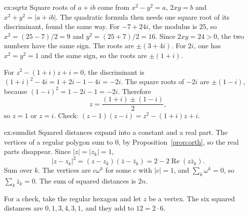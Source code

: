 \begin{solution}{ex:sqrtz}
\idea Square roots of $a+ib$ come from $x^2-y^2=a$, $2xy=b$ and $x^2+y^2=|a+ib|$. The quadratic formula then needs one square root of its discriminant, found the same way.
\writeup For $-7+24i$, the modulus is $25$, so $x^2=(25-7)/2=9$ and $y^2=(25+7)/2=16$. Since $2xy=24>0$, the two numbers have the same sign. The roots are $\pm(3+4i)$. For $2i$, one has $x^2=y^2=1$ and the same sign, so the roots are $\pm(1+i)$.

For $z^2-(1+i)z+i=0$, the discriminant is $(1+i)^2-4i=1+2i-1-4i=-2i$. The square roots of $-2i$ are $\pm(1-i)$, because $(1-i)^2=1-2i-1=-2i$. Therefore
\[
z=\frac{(1+i)\pm(1-i)}2,
\]
so $z=1$ or $z=i$. Check: $(z-1)(z-i)=z^2-(1+i)z+i$.
\end{solution}

\begin{solution}{ex:sumdist}
\idea Squared distances expand into a constant and a real part. The vertices of a regular polygon sum to $0$, by Proposition~\ref{prop:orth}, so the real parts disappear.
\writeup Since $|z|=|z_k|=1$,
\[
|z-z_k|^2=(z-z_k)(\bar z-\bar z_k)=2-2\operatorname{Re}(z\bar z_k).
\]
Sum over $k$. The vertices are $c\omega^k$ for some $c$ with $|c|=1$, and $\sum_k\omega^k=0$, so $\sum_k\bar z_k=0$. The sum of squared distances is $2n$.

For a check, take the regular hexagon and let $z$ be a vertex. The six squared distances are $0,1,3,4,3,1$, and they add to $12=2\cdot6$.
\end{solution}

